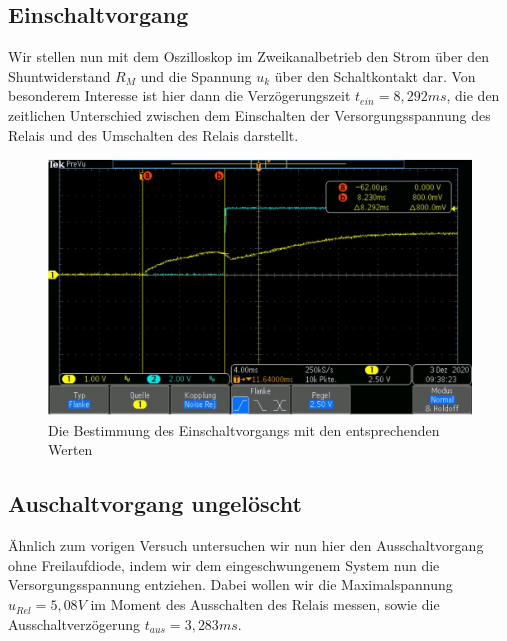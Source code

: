 \documentclass{article}
\begin{document}
\subsection{Einschaltvorgang}

Wir stellen nun mit dem Oszilloskop im Zweikanalbetrieb den Strom über den Shuntwiderstand $R_M$ und die Spannung $u_k$ über den Schaltkontakt dar.
Von besonderem Interesse ist hier dann die Verzögerungszeit $t_{ein} = 8,292ms$, die den zeitlichen Unterschied zwischen dem Einschalten der Versorgungsspannung des
Relais und des Umschalten des Relais darstellt.

\begin{figure}[h]
    \begin{center}
        \includegraphics[scale=0.45]{../assets/images/ET2P4/aufgabe2b.JPG}
        \caption{Die Bestimmung des Einschaltvorgangs mit den entsprechenden Werten}
    \end{center}
\end{figure}

\subsection{Auschaltvorgang ungelöscht}

Ähnlich zum vorigen Versuch untersuchen wir nun hier den Ausschaltvorgang ohne Freilaufdiode, indem wir dem eingeschwungenem System nun die 
Versorgungsspannung entziehen. Dabei wollen wir die Maximalspannung $\hat{u}_{Rel} = 5,08V$ im Moment des Ausschalten des Relais messen, sowie die Ausschaltverzögerung
$t_{aus} = 3,283ms$.
\end{document}
